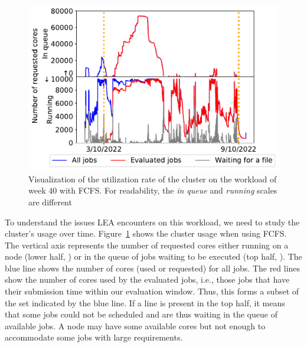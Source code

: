\documentclass[conference]{IEEEtran}
\newcommand{\us}{\ensuremath{\mathit{user~session}}\xspace}
\newcommand{\uss}{\ensuremath{\mathit{user~sessions}}\xspace}
\newcommand{\rev}[1]{{\color{black}{#1}}}
\begin{document}

\begin{figure}[t]\centering\includegraphics[width=0.9\linewidth]{../MBSS/plot/Cluster_usage/2022-10-03->2022-10-09_V10000_anonymous_Fcfs_Used_nodes_450_128_32_256_4_1024_core_by_core.pdf}\caption{Visualization
of the utilization rate of the cluster on the workload of week 40 with
FCFS. For readability, the \emph{in queue} and \emph{running} scales are
different}\label{40_cluster_usage_fcfs}\end{figure}
To understand the issues LEA encounters on this workload, we need to study the cluster's usage over time.
Figure~\ref{40_cluster_usage_fcfs} shows the cluster usage when using FCFS.
The vertical axis represents the number of requested cores either running on a
node (lower half, \rev{the maximum is the total number of cores on our cluster: 9720}) or in the queue of jobs waiting to be executed (top
half, \rev{where the number of requested cores can be much higher than the cluster's capability}).
The blue line shows the number of cores (used or requested) for all jobs.
The red lines show the number of cores used by the evaluated jobs, i.e.,
those jobs that have their submission time within our evaluation window. Thus, this forms a subset
of the set indicated by the blue line.
If a line is present in the top half, it means that some jobs could not be scheduled
and are thus waiting in the queue of available jobs. 
A node may have some available cores but not enough to accommodate some jobs with large requirements.
\end{document}
